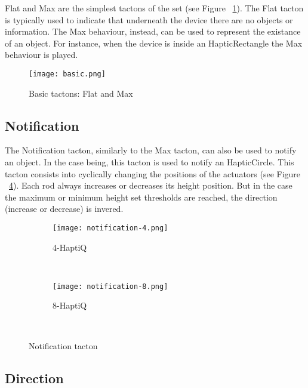 Flat and Max are the simplest tactons of the set (see Figure ~\ref{fig:Basictactons}). The Flat tacton is typically used to indicate that underneath the device there are no objects or information. The Max behaviour, instead, can be used to represent the existance of an object. For instance, when the device is inside an HapticRectangle the Max behaviour is played. 

\begin{figure}[H]
  \centering
  \texttt{[image: basic.png]}
  \caption{Basic tactons: Flat and Max}
  \label{fig:Basictactons}
\end{figure}

\subsection{Notification}

The Notification tacton, similarly to the Max tacton, can also be used to notify an object. In the case being, this tacton is used to notify an HapticCircle. This tacton consists into cyclically changing the positions of the actuators (see Figure ~\ref{fig:notification}). Each rod always increases or decreases its height position. But in the case the maximum or minimum height set thresholds are reached, the direction (increase or decrease) is invered.

\begin{figure}[H]
        \centering
        \begin{subfigure}[H]{0.5\textwidth}
                \texttt{[image: notification-4.png]}
                \caption{4-HaptiQ}
                \label{fig:notification-4}
        \end{subfigure}%
        ~ %
        \begin{subfigure}[H]{0.5\textwidth}
                \texttt{[image: notification-8.png]}
                \caption{8-HaptiQ}
                \label{fig:notification-8}
        \end{subfigure}
        ~ %
        \caption{Notification tacton}\label{fig:notification}
\end{figure}

\subsection{Direction}

